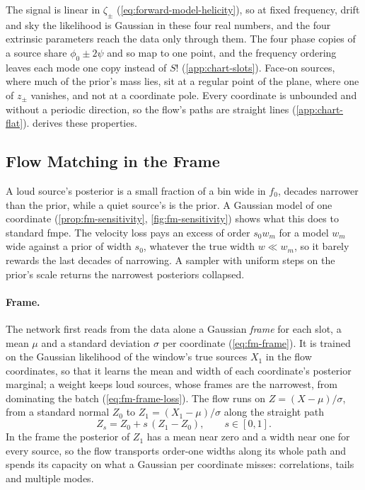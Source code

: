 The signal is linear in $\zeta_\pm$ (\cref{eq:forward-model-helicity}), so at fixed frequency, drift
and sky the likelihood is Gaussian in these four real numbers, and the four extrinsic parameters
reach the data only through them. The four phase copies of a source share $\phi_0\pm2\psi$ and so
map to one point, and the frequency ordering leaves each mode one copy instead of $S!$
(\cref{app:chart-slots}). Face-on sources, where much of the prior's mass lies, sit at a regular point of the
plane, where one of $z_\pm$ vanishes, and not at a coordinate pole. Every coordinate is unbounded and
without a periodic direction, so the flow's paths are straight lines (\cref{app:chart-flat}).
 derives these properties.

\subsection{Flow Matching in the Frame}
\label{sec:method-fm}

A loud source's posterior is a small fraction of a bin wide in $f_0$, decades narrower than the
prior, while a quiet source's is the prior. A Gaussian model of one coordinate
(\cref{prop:fm-sensitivity}, \cref{fig:fm-sensitivity}) shows what this does to standard
\ac{fmpe}. The velocity loss pays an excess of order $s_0 w_m$ for a model $w_m$ wide against a
prior of width $s_0$, whatever the true width $w\ll w_m$, so it barely rewards the last decades of
narrowing. A sampler with uniform steps on the prior's scale returns the narrowest posteriors
collapsed.

\paragraph{Frame.}
The network first reads from the data alone a Gaussian \emph{frame} for each slot, a mean $\mu$
and a standard deviation $\sigma$ per coordinate (\cref{eq:fm-frame}). It is trained on the
Gaussian likelihood of the window's true sources $X_1$ in the flow coordinates, so that it learns
the mean and width of each coordinate's posterior marginal; a weight keeps loud sources, whose
frames are the narrowest, from dominating the batch (\cref{eq:fm-frame-loss}). The flow runs on
$Z=(X-\mu)/\sigma$, from a standard normal $Z_0$ to $Z_1=(X_1-\mu)/\sigma$ along the straight path
\begin{equation}
  Z_s = Z_0 + s\,(Z_1 - Z_0),\qquad s\in[0,1].
  \label{eq:fm-path}
\end{equation}
In the frame the posterior of $Z_1$ has a mean near zero and a width near one for every source, so
the flow transports order-one widths along its whole path and spends its capacity on what a
Gaussian per coordinate misses: correlations, tails and multiple modes.

